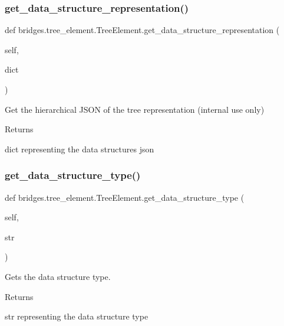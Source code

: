 \subsubsection{\texorpdfstring{get\+\_\+data\+\_\+structure\+\_\+representation()}{get\_data\_structure\_representation()}}
{\footnotesize\ttfamily def bridges.\+tree\+\_\+element.\+Tree\+Element.\+get\+\_\+data\+\_\+structure\+\_\+representation (\begin{DoxyParamCaption}\item[{}]{self,  }\item[{}]{dict }\end{DoxyParamCaption})}



Get the hierarchical J\+S\+ON of the tree representation (internal use only) 

\begin{DoxyReturn}{Returns}


dict representing the data structures json 
\end{DoxyReturn}
\mbox{\label{classbridges_1_1tree__element_1_1_tree_element_aeefaf309c1271b2e7272cf63be496457}} 
\subsubsection{\texorpdfstring{get\+\_\+data\+\_\+structure\+\_\+type()}{get\_data\_structure\_type()}}
{\footnotesize\ttfamily def bridges.\+tree\+\_\+element.\+Tree\+Element.\+get\+\_\+data\+\_\+structure\+\_\+type (\begin{DoxyParamCaption}\item[{}]{self,  }\item[{}]{str }\end{DoxyParamCaption})}



Gets the data structure type. 

\begin{DoxyReturn}{Returns}


str representing the data structure type 
\end{DoxyReturn}
\mbox{\label{classbridges_1_1tree__element_1_1_tree_element_a5d0c6335324d675a6c0329dad72fca4d}} 
